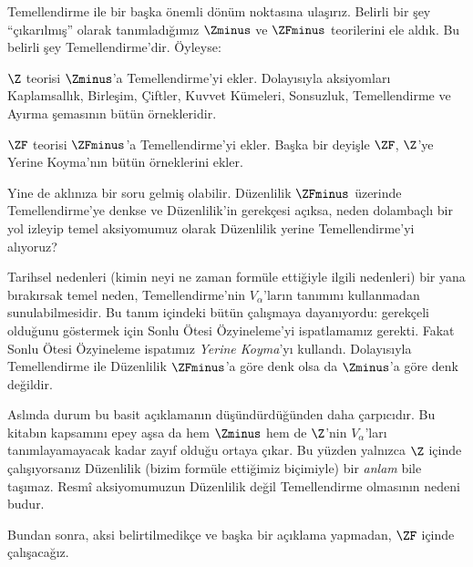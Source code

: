 


Temellendirme ile bir başka önemli dönüm noktasına ulaşırız. Belirli bir şey
``çıkarılmış'' olarak tanımladığımız $\Zminus$ ve $\ZFminus$ teorilerini
ele aldık. Bu belirli şey Temellendirme'dir. Öyleyse:

\begin{defn}
$\Z$ teorisi $\Zminus$'a Temellendirme'yi ekler. Dolayısıyla aksiyomları
Kaplamsallık, Birleşim, Çiftler, Kuvvet Kümeleri, Sonsuzluk, Temellendirme ve
Ayırma şemasının bütün örnekleridir.

$\ZF$ teorisi $\ZFminus$'a Temellendirme'yi ekler. Başka bir deyişle
$\ZF$, $\Z$'ye Yerine Koyma'nın bütün örneklerini ekler.
\end{defn}

Yine de aklınıza bir soru gelmiş olabilir. Düzenlilik $\ZFminus$ üzerinde
Temellendirme'ye denkse ve Düzenlilik'in gerekçesi açıksa, neden dolambaçlı
bir yol izleyip temel aksiyomumuz olarak Düzenlilik yerine Temellendirme'yi
alıyoruz?

Tarihsel nedenleri (kimin neyi ne zaman formüle ettiğiyle ilgili nedenleri)
bir yana bırakırsak temel neden, Temellendirme'nin $V_\alpha$'ların tanımını
kullanmadan sunulabilmesidir. Bu tanım  içindeki
bütün çalışmaya dayanıyordu: gerekçeli olduğunu göstermek için Sonlu Ötesi
Özyineleme'yi ispatlamamız gerekti. Fakat Sonlu Ötesi Özyineleme ispatımız
\emph{Yerine Koyma}'yı kullandı. Dolayısıyla Temellendirme ile Düzenlilik
$\ZFminus$'a göre denk olsa da $\Zminus$'a göre denk değildir.

Aslında durum bu basit açıklamanın düşündürdüğünden daha çarpıcıdır. Bu
kitabın kapsamını epey aşsa da hem $\Zminus$ hem de $\Z$'nin
$V_\alpha$'ları tanımlayamayacak kadar zayıf olduğu ortaya çıkar. Bu yüzden
yalnızca $\Z$ içinde çalışıyorsanız Düzenlilik (bizim formüle ettiğimiz
biçimiyle) bir \emph{anlam} bile taşımaz. Resmî aksiyomumuzun Düzenlilik
değil Temellendirme olmasının nedeni budur.

Bundan sonra, aksi belirtilmedikçe ve başka bir açıklama yapmadan, $\ZF$
içinde çalışacağız.

